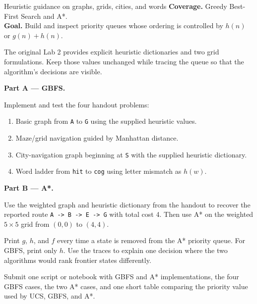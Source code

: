 
\begin{labproject}{Heuristic guidance on graphs, grids, cities, and words}
\textbf{Coverage.} Greedy Best-First Search and A*.\\
\textbf{Goal.} Build and inspect priority queues whose ordering is controlled by \(h(n)\) or \(g(n)+h(n)\).

\begin{labmode}
The original Lab 2 provides explicit heuristic dictionaries and two grid formulations. Keep those values unchanged while tracing the queue so that the algorithm's decisions are visible.
\end{labmode}

\medskip\noindent\textbf{Part A --- GBFS.}\par
Implement and test the four handout problems:
\begin{enumerate}
  \item Basic graph from \texttt{A} to \texttt{G} using the supplied heuristic values.
  \item Maze/grid navigation guided by Manhattan distance.
  \item City-navigation graph beginning at \texttt{S} with the supplied heuristic dictionary.
  \item Word ladder from \texttt{hit} to \texttt{cog} using letter mismatch as \(h(w)\).
\end{enumerate}

\medskip\noindent\textbf{Part B --- A*.}\par
Use the weighted graph and heuristic dictionary from the handout to recover the reported route \texttt{A -> B -> E -> G} with total cost 4. Then use A* on the weighted \(5\times5\) grid from \((0,0)\) to \((4,4)\).

\begin{tryit}
Print \(g\), \(h\), and \(f\) every time a state is removed from the A* priority queue. For GBFS, print only \(h\). Use the traces to explain one decision where the two algorithms would rank frontier states differently.
\end{tryit}
\end{labproject}

\begin{labdeliverable}
Submit one script or notebook with GBFS and A* implementations, the four GBFS cases, the two A* cases, and one short table comparing the priority value used by UCS, GBFS, and A*.
\end{labdeliverable}
